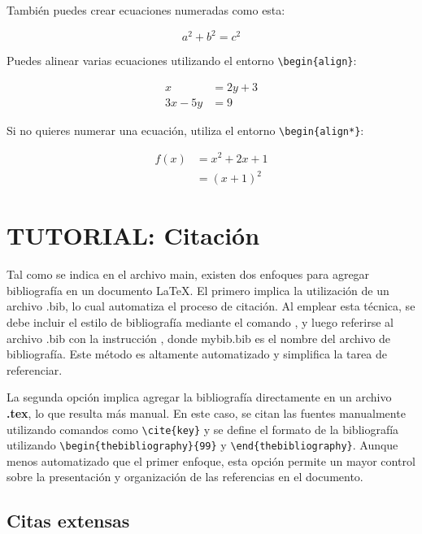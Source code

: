 También puedes crear ecuaciones numeradas como esta:

\begin{equation}
    a^2 + b^2 = c^2
\end{equation}

Puedes alinear varias ecuaciones utilizando el entorno \verb|\begin{align}|:

\begin{align}
    x &= 2y + 3 \\
    3x - 5y &= 9
\end{align}

Si no quieres numerar una ecuación, utiliza el entorno \verb|\begin{align*}|:

\begin{align*}
    f(x) &= x^2 + 2x + 1 \\
    &= (x + 1)^2
\end{align*}

\newpage
\section{TUTORIAL: Citación}

Tal como se indica en el archivo main, existen dos enfoques para agregar bibliografía en un documento \LaTeX. El primero implica la utilización de un archivo .bib, lo cual automatiza el proceso de citación. Al emplear esta técnica, se debe incluir el estilo de bibliografía mediante el comando \verb||, y luego referirse al archivo .bib con la instrucción \verb||, donde mybib.bib es el nombre del archivo de bibliografía. Este método es altamente automatizado y simplifica la tarea de referenciar.

La segunda opción implica agregar la bibliografía directamente en un archivo \textbf{.tex}, lo que resulta más manual. En este caso, se citan las fuentes manualmente utilizando comandos como \verb|\cite{key}| y se define el formato de la bibliografía utilizando \verb|\begin{thebibliography}{99}| y \verb|\end{thebibliography}|. Aunque menos automatizado que el primer enfoque, esta opción permite un mayor control sobre la presentación y organización de las referencias en el documento.

\subsection{Citas extensas}

